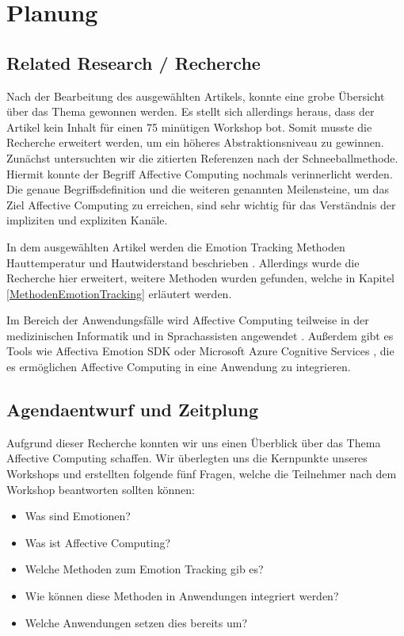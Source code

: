 \section{Planung}
\subsection{Related Research / Recherche }
Nach der Bearbeitung des ausgewählten Artikels, konnte eine grobe Übersicht über das Thema gewonnen werden. Es stellt sich allerdings heraus, dass der Artikel kein Inhalt für einen 75 minütigen Workshop bot. Somit musste die Recherche erweitert werden, um ein höheres Abstraktionsniveau zu gewinnen. Zunächst untersuchten wir die zitierten Referenzen nach der Schneeballmethode. Hiermit konnte der Begriff Affective Computing nochmals verinnerlicht werden\cite{Picard}. Die genaue Begriffsdefinition und die weiteren genannten Meilensteine, um das Ziel Affective Computing zu erreichen, sind sehr wichtig für das Verständnis der impliziten und expliziten Kanäle\cite{KimNS}. 

In dem ausgewählten Artikel werden die Emotion Tracking Methoden Hauttemperatur und Hautwiderstand beschrieben \cite{cowie}\cite{zeng}\cite{lee}. Allerdings wurde die Recherche hier erweitert, weitere Methoden wurden gefunden, welche in Kapitel \ref{MethodenEmotionTracking} erläutert werden. 

Im Bereich der Anwendungsfälle wird Affective Computing teilweise in der medizinischen Informatik und in Sprachassisten angewendet \cite{medicine}\cite{sprachassi}. Außerdem gibt es Tools wie Affectiva Emotion SDK \cite{affectiva} oder Microsoft Azure Cognitive Services \cite{MicrosoftAzure}, die es ermöglichen Affective Computing in eine Anwendung zu integrieren.

\subsection{Agendaentwurf und Zeitplung}
Aufgrund dieser Recherche konnten wir uns einen Überblick über das Thema Affective Computing schaffen. Wir überlegten uns die Kernpunkte unseres Workshops und erstellten folgende fünf Fragen, welche die Teilnehmer nach dem Workshop beantworten sollten können:

\begin{itemize}
	\item Was sind Emotionen?
	\item Was ist Affective Computing?
	\item Welche Methoden zum Emotion Tracking gib es?
	\item Wie können diese Methoden in Anwendungen integriert werden?
	\item Welche Anwendungen setzen dies bereits um? 
\end{itemize}

